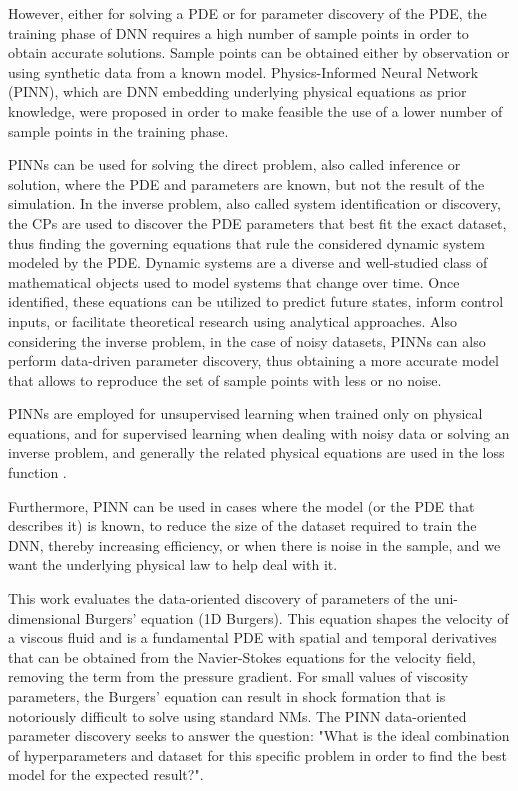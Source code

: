 \documentclass[conference]{IEEEtran}
\begin{document}
However, either for solving a PDE or for  parameter discovery of the PDE, the training phase of DNN requires a high number of sample points in order to obtain accurate solutions. Sample points can be obtained either by observation or using synthetic data from a known model. Physics-Informed Neural Network (PINN), which are DNN embedding underlying physical equations as prior knowledge, were proposed in order to make feasible the use of a lower number of sample points in the training phase. 


PINNs can be used for solving the direct problem, also called inference or solution, where the PDE and parameters are known, but not the result of the simulation. In the inverse problem, also called system identification or discovery, the CPs are used to discover the PDE parameters that best fit the exact dataset, thus finding the governing equations that rule the considered dynamic system modeled by the PDE. Dynamic systems are a diverse and well-studied class of mathematical objects used to model systems that change over time. Once identified, these equations can be utilized to predict future states, inform control inputs, or facilitate theoretical research using analytical approaches. Also considering the inverse problem, in the case of noisy datasets, PINNs can also perform data-driven parameter discovery, thus obtaining a more accurate model that allows to reproduce the set of sample points with less or no noise.

PINNs are employed for unsupervised learning when trained only on physical equations, and for supervised learning when dealing with noisy data or solving an inverse problem, and generally the related physical equations are used in the loss function \cite{Cuomo2022}.

Furthermore, PINN can be used in cases where the model (or the PDE that describes it) is known, to reduce the size of the dataset required to train the DNN, thereby increasing efficiency, or when there is noise in the sample, and we want the underlying physical law to help deal with it.

This work evaluates the data-oriented discovery of parameters of the uni-dimensional Burgers' equation (1D Burgers). This equation shapes the velocity of a viscous fluid and is a fundamental PDE with spatial and temporal derivatives that can be obtained from the Navier-Stokes equations for the velocity field, removing the term from the pressure gradient. For small values of viscosity parameters, the Burgers' equation can result in shock formation that is notoriously difficult to solve using standard NMs. The PINN data-oriented parameter discovery seeks to answer the question: "What is the ideal combination of hyperparameters and dataset for this specific problem in order to find the best model for the expected result?". 
\end{document}

